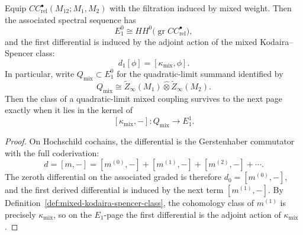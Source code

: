 \begin{theorem}
\label{thm:first-correction-theorem}
Equip $CC^\bullet_{\mathrm{rel}}(M_{12};M_1,M_2)$ with the filtration induced by mixed weight. Then the associated spectral sequence has
\[
E_1^0 \cong HH^0\bigl(\operatorname{gr} CC^\bullet_{\mathrm{rel}}\bigr),
\]
and the first differential is induced by the adjoint action of the mixed Kodaira--Spencer class:
\[
d_1[\phi] = [\kappa_{\mathrm{mix}},\phi].
\]
In particular, write $Q_{\mathrm{mix}}\subset E_1^0$ for the
quadratic-limit summand identified by
\[
Q_{\mathrm{mix}}
\cong
\widetilde Z_\infty(M_1)\widehat\otimes \widetilde Z_\infty(M_2).
\]
Then the class of a quadratic-limit mixed coupling survives to the next
page exactly when it lies in the kernel of
\[
[\kappa_{\mathrm{mix}},-] :
Q_{\mathrm{mix}}
\longrightarrow E_1^1.
\]
\end{theorem}

\begin{proof}
On Hochschild cochains, the differential is the Gerstenhaber commutator with the full coderivation:
\[
d = [m,-] = [m^{(0)},-] + [m^{(1)},-] + [m^{(2)},-] + \cdots.
\]
The zeroth differential on the associated graded is therefore $d_0=[m^{(0)},-]$, and the first derived differential is induced by the next term $[m^{(1)},-]$. By Definition~\ref{def:mixed-kodaira-spencer-class}, the cohomology class of $m^{(1)}$ is precisely $\kappa_{\mathrm{mix}}$, so on the $E_1$-page the first differential is the adjoint action of $\kappa_{\mathrm{mix}}$.
\end{proof}

